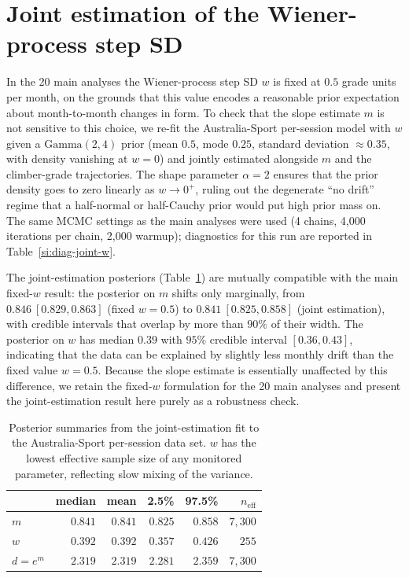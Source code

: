 \documentclass[11pt]{article}
\begin{document}
\section{Joint estimation of the Wiener-process step SD}
\label{si:joint-w}

In the 20 main analyses the Wiener-process step SD $w$ is fixed at $0.5$ grade units per month, on the grounds that this value encodes a reasonable prior expectation about month-to-month changes in form. To check that the slope estimate $m$ is not sensitive to this choice, we re-fit the Australia-Sport per-session model with $w$ given a $\mathrm{Gamma}(2, 4)$ prior (mean $0.5$, mode $0.25$, standard deviation $\approx 0.35$, with density vanishing at $w=0$) and jointly estimated alongside $m$ and the climber-grade trajectories. The shape parameter $\alpha = 2$ ensures that the prior density goes to zero linearly as $w \to 0^+$, ruling out the degenerate ``no drift'' regime that a half-normal or half-Cauchy prior would put high prior mass on. The same MCMC settings as the main analyses were used (4 chains, 4{,}000 iterations per chain, 2{,}000 warmup); diagnostics for this run are reported in Table~\ref{si:diag-joint-w}.

The joint-estimation posteriors (Table~\ref{si:joint-w-summary}) are mutually compatible with the main fixed-$w$ result: the posterior on $m$ shifts only marginally, from $0.846\ [0.829, 0.863]$ (fixed $w=0.5$) to $0.841\ [0.825, 0.858]$ (joint estimation), with credible intervals that overlap by more than $90\%$ of their width. The posterior on $w$ has median $0.39$ with $95\%$ credible interval $[0.36, 0.43]$, indicating that the data can be explained by slightly less monthly drift than the fixed value $w = 0.5$. Because the slope estimate is essentially unaffected by this difference, we retain the fixed-$w$ formulation for the 20 main analyses and present the joint-estimation result here purely as a robustness check.

\begin{table}[ht]
\centering
\begin{tabular}{lrrrrr}
\toprule
& {\bf median} & {\bf mean} & {\bf 2.5\%} & {\bf 97.5\%} & {\bf $n_{\mathrm{eff}}$} \\
\midrule
$m$         & $0.841$ & $0.841$ & $0.825$ & $0.858$ & $7{,}300$ \\
$w$         & $0.392$ & $0.392$ & $0.357$ & $0.426$ & $255$     \\
$d = e^m$   & $2.319$ & $2.319$ & $2.281$ & $2.359$ & $7{,}300$ \\
\bottomrule
\end{tabular}
\caption{Posterior summaries from the joint-estimation fit to the Australia-Sport per-session data set. $w$ has the lowest effective sample size of any monitored parameter, reflecting slow mixing of the variance.}
\label{si:joint-w-summary}
\end{table}
\end{document}
